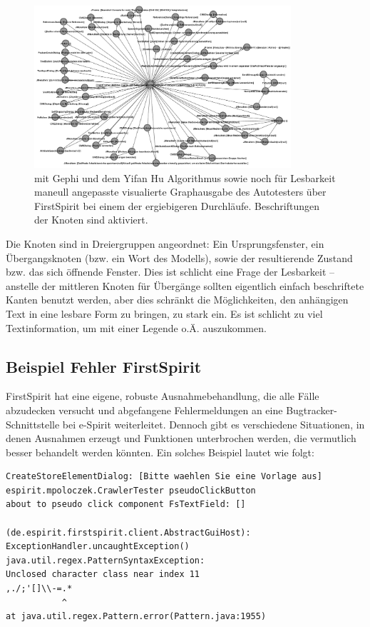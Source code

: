 \begin{figure}
	\centering
	\includegraphics[width=0.85\textwidth]{bilder/model_freespirit.png}
	\caption{mit Gephi und dem Yifan Hu Algorithmus \cite{hu2005efficient}
    sowie noch für Lesbarkeit maneull angepasste visualierte Graphausgabe 
	des Autotesters über FirstSpirit bei einem der ergiebigeren Durchläufe.
	Beschriftungen der Knoten sind aktiviert.}
	\label{fig:model_freespirit_06.10.2015}
\end{figure}



Die Knoten sind in Dreiergruppen angeordnet: Ein Ursprungsfenster, ein Übergangsknoten
(bzw. ein Wort des Modells), sowie der resultierende Zustand bzw. das sich öffnende Fenster.
Dies ist schlicht eine Frage der Lesbarkeit -- anstelle der mittleren Knoten für Übergänge sollten
eigentlich einfach beschriftete Kanten benutzt werden, aber dies schränkt die Möglichkeiten,
den anhängigen Text in eine lesbare Form zu bringen, zu stark ein. Es ist schlicht zu viel
Textinformation, um mit einer Legende o.Ä. auszukommen.

\subsection{Beispiel Fehler FirstSpirit}

FirstSpirit hat eine eigene, robuste Ausnahmebehandlung, die alle Fälle abzudecken
versucht und abgefangene Fehlermeldungen an eine Bugtracker-Schnittstelle bei e-Spirit
weiterleitet. Dennoch gibt es verschiedene Situationen, in denen Ausnahmen erzeugt
und Funktionen unterbrochen werden, die vermutlich besser behandelt werden könnten.
Ein solches Beispiel lautet wie folgt:

\begin{lstlisting}[float=!ht,label=fmjson,caption={Ausnahme bei Eingabe in Suchfeld}]
CreateStoreElementDialog: [Bitte waehlen Sie eine Vorlage aus]
espirit.mpoloczek.CrawlerTester pseudoClickButton
about to pseudo click component FsTextField: []

(de.espirit.firstspirit.client.AbstractGuiHost):
ExceptionHandler.uncaughtException()
java.util.regex.PatternSyntaxException: 
Unclosed character class near index 11
,./;'[]\\-=.*
           ^
at java.util.regex.Pattern.error(Pattern.java:1955)
\end{lstlisting}

